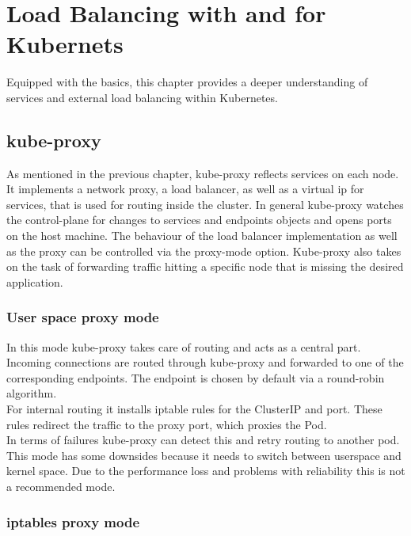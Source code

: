 \chapter{Load Balancing with and for Kubernets}

Equipped with the basics, this chapter provides a deeper understanding of services and external load balancing within Kubernetes.

\section{kube-proxy}\label{sec:kubeproxy}

As mentioned in the previous chapter, kube-proxy reflects services on each node.
It implements a network proxy, a load balancer, as well as a virtual ip for services, that is used for routing inside the cluster.
In general kube-proxy watches the control-plane for changes to services and endpoints objects and opens ports on the host machine.
The behaviour of the load balancer implementation as well as the proxy can be controlled via the proxy-mode option.
Kube-proxy also takes on the task of forwarding traffic hitting a specific node that is missing the desired application.~\cite{KUBERNETES-SERVICE}

\subsection{User space proxy mode}

In this mode kube-proxy takes care of routing and acts as a central part.
\\
Incoming connections are routed through kube-proxy and forwarded to one of the corresponding endpoints.
The endpoint is chosen by default via a round-robin algorithm.
\\
For internal routing it installs iptable rules for the ClusterIP and port.
These rules redirect the traffic to the proxy port, which proxies the Pod.
\\
In terms of failures kube-proxy can detect this and retry routing to another pod.
\\
This mode has some downsides because it needs to switch between userspace and kernel space.
Due to the performance loss and problems with reliability this is not a recommended mode.~\cite{KUBERNETES-SERVICE}

\subsection{iptables proxy mode}

